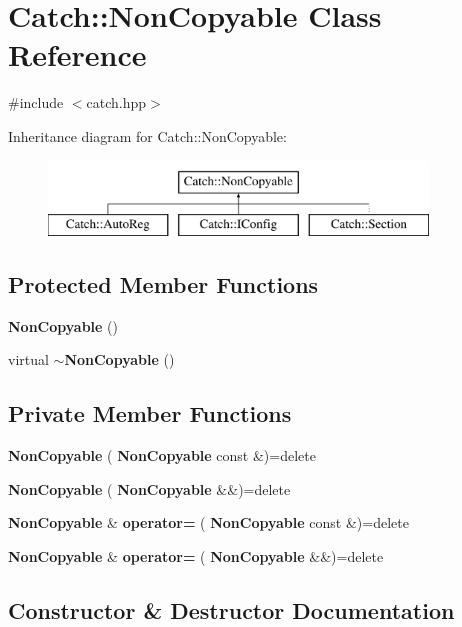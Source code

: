 \section{Catch\+::Non\+Copyable Class Reference}
\label{class_catch_1_1_non_copyable}


{\ttfamily \#include $<$catch.\+hpp$>$}

Inheritance diagram for Catch\+::Non\+Copyable\+:\begin{figure}[H]
\begin{center}
\leavevmode
\includegraphics[height=2.000000cm]{class_catch_1_1_non_copyable}
\end{center}
\end{figure}
\subsection*{Protected Member Functions}
\begin{DoxyCompactItemize}
\item 
\textbf{ Non\+Copyable} ()
\item 
virtual \textbf{ $\sim$\+Non\+Copyable} ()
\end{DoxyCompactItemize}
\subsection*{Private Member Functions}
\begin{DoxyCompactItemize}
\item 
\textbf{ Non\+Copyable} (\textbf{ Non\+Copyable} const \&)=delete
\item 
\textbf{ Non\+Copyable} (\textbf{ Non\+Copyable} \&\&)=delete
\item 
\textbf{ Non\+Copyable} \& \textbf{ operator=} (\textbf{ Non\+Copyable} const \&)=delete
\item 
\textbf{ Non\+Copyable} \& \textbf{ operator=} (\textbf{ Non\+Copyable} \&\&)=delete
\end{DoxyCompactItemize}


\subsection{Constructor \& Destructor Documentation}
\mbox{\label{class_catch_1_1_non_copyable_a74cf3e4aa051c284941e39b436b2f693}} 
